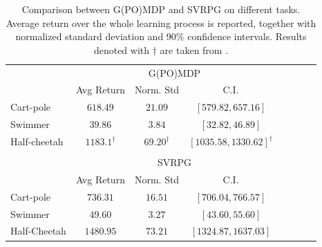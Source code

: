 \begin{table}[h]
	\caption{
		\label{tab:1}
		Comparison between G(PO)MDP and \acs{SVRPG} on different tasks. Average return over the whole learning process is reported, together with normalized standard deviation and 90\% confidence intervals. Results denoted with $\dagger$ are taken from \cite{duan2016benchmarking}.}
	\centering
	\begin{tabular}{@{}lccccccc@{}} 
		\toprule
		\phantom{abc} & \multicolumn{3}{c}{G(PO)MDP} \\
		\cmidrule{2-4}
		\phantom{abc} & Avg Return & Norm. Std & C.I.
		\\\cmidrule{2-4}
		Cart-pole & $618.49$ & $21.09$ & $[579.82, 657.16]$\\
		Swimmer & $39.86$ & $3.84$ & $[32.82, 46.89]$\\
		Half-cheetah & $1183.1^\dagger$ & $69.20^\dagger$ & $[1035.58, 1330.62]^\dagger$\\
		\\\cmidrule{2-4}
		\phantom{abc} & \multicolumn{3}{c}{SVRPG}
		\\\cmidrule{2-4}
		\phantom{abc} & Avg Return & Norm. Std & C.I.
		\\\cmidrule{2-4}
		Cart-pole & $736.31$ & $16.51$ & $[706.04, 766.57]$\\
		Swimmer & $49.60$ & $3.27$ & $[43.60, 55.60]$\\
		Half-Cheetah & $1480.95$ & $73.21$ & $[1324.87, 1637.03]$\\
		\bottomrule
	\end{tabular}
	\vspace{-0.05in}
\end{table}

